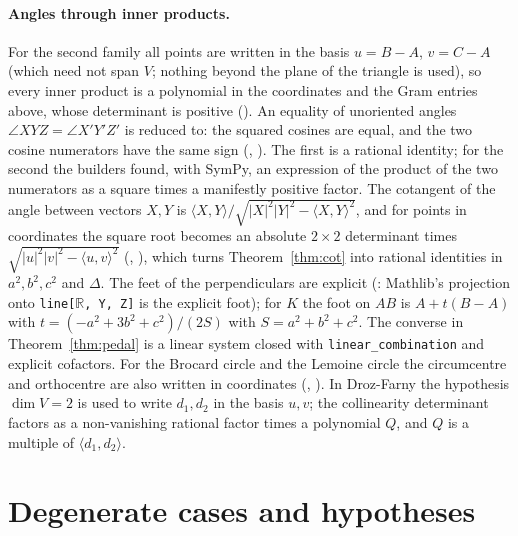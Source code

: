 \documentclass[11pt]{article}
\theoremstyle{definition}
\theoremstyle{remark}
\newcommand{\lean}[1]{\texttt{#1}}
\begin{document}
\paragraph{Angles through inner products.} For the second family all points are written in the
basis $u=B-A$, $v=C-A$ (which need not span $V$; nothing beyond the plane of the triangle is used), so
every inner product is a polynomial in the coordinates and the Gram entries above, whose determinant
is positive (). An equality of unoriented angles $\angle XYZ=\angle X'Y'Z'$
is reduced to: the squared cosines are equal, and the two cosine numerators have the same sign
(, ). The first is a rational
identity; for the second the builders found, with SymPy, an expression of the product of the two
numerators as a square times a manifestly positive factor. The cotangent of the angle between vectors $X,Y$ is
$\langle X,Y\rangle/\sqrt{|X|^2|Y|^2-\langle X,Y\rangle^2}$, and for points in coordinates the
square root becomes an absolute $2\times2$ determinant times $\sqrt{|u|^2|v|^2-\langle u,v\rangle^2}$
(, ), which turns
Theorem~\ref{thm:cot} into rational identities in $a^2,b^2,c^2$ and $\Delta$. The feet of the
perpendiculars are explicit (: Mathlib's projection onto
\lean{line[\(\mathbb{R}\), Y, Z]} is the explicit foot); for $K$ the foot on $AB$ is $A+t(B-A)$ with
$t=(-a^2+3b^2+c^2)/(2S)$ with $S=a^2+b^2+c^2$. The converse in Theorem~\ref{thm:pedal} is a linear
system closed with \lean{linear\_combination} and explicit cofactors. For the Brocard circle and the
Lemoine circle the circumcentre and orthocentre are also written in coordinates
(, ). In Droz-Farny the
hypothesis $\dim V=2$ is used to write $d_1,d_2$ in the basis $u,v$; the collinearity determinant
factors as a non-vanishing rational factor times a polynomial $Q$, and $Q$ is a multiple of
$\langle d_1,d_2\rangle$.

\section{Degenerate cases and hypotheses}\label{sec:degenerate}
\end{document}
